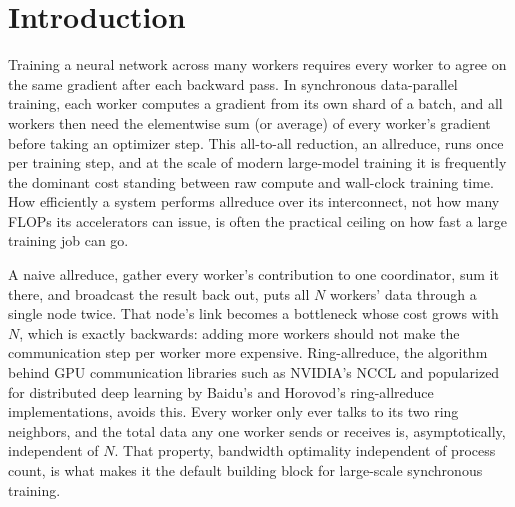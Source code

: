 \section{Introduction}
\label{sec:introduction}

Training a neural network across many workers requires every worker to agree on the same gradient after each backward pass. In synchronous data-parallel training, each worker computes a gradient from its own shard of a batch, and all workers then need the elementwise sum (or average) of every worker's gradient before taking an optimizer step. This all-to-all reduction, an allreduce, runs once per training step, and at the scale of modern large-model training it is frequently the dominant cost standing between raw compute and wall-clock training time. How efficiently a system performs allreduce over its interconnect, not how many FLOPs its accelerators can issue, is often the practical ceiling on how fast a large training job can go.

A naive allreduce, gather every worker's contribution to one coordinator, sum it there, and broadcast the result back out, puts all $N$ workers' data through a single node twice. That node's link becomes a bottleneck whose cost grows with $N$, which is exactly backwards: adding more workers should not make the communication step per worker more expensive. Ring-allreduce, the algorithm behind GPU communication libraries such as NVIDIA's NCCL \citep{nvidia2024nccl} and popularized for distributed deep learning by Baidu's and Horovod's ring-allreduce implementations, avoids this. Every worker only ever talks to its two ring neighbors, and the total data any one worker sends or receives is, asymptotically, independent of $N$. That property, bandwidth optimality independent of process count, is what makes it the default building block for large-scale synchronous training.

